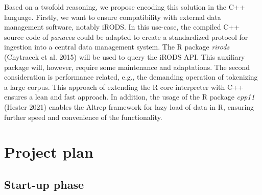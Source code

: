 \documentclass[]{article}
\begin{document}
Based on a twofold reasoning, we propose encoding this solution in the C++ language. Firstly, we want to ensure compatibility with external data management software, notably iRODS. In this use-case, the compiled C++ source code of \emph{panacea} could be adapted to create a standardized protocol for ingestion into a central data management system. The R package \emph{rirods} (Chytracek et al. 2015) will be used to query the iRODS API. This auxiliary package will, however, require some maintenance and adaptations. The second consideration is performance related, e.g., the demanding operation of tokenizing a large corpus. This approach of extending the R core interpreter with C++ ensures a lean and fast approach. In addition, the usage of the R package \emph{cpp11} (Hester 2021) enables the Altrep framework for lazy load of data in R, ensuring further speed and convenience of the functionality.

\hypertarget{project-plan}{%
\section{Project plan}\label{project-plan}}

\hypertarget{sec:Start}{%
\subsection{Start-up phase}\label{sec:Start}}
\end{document}
